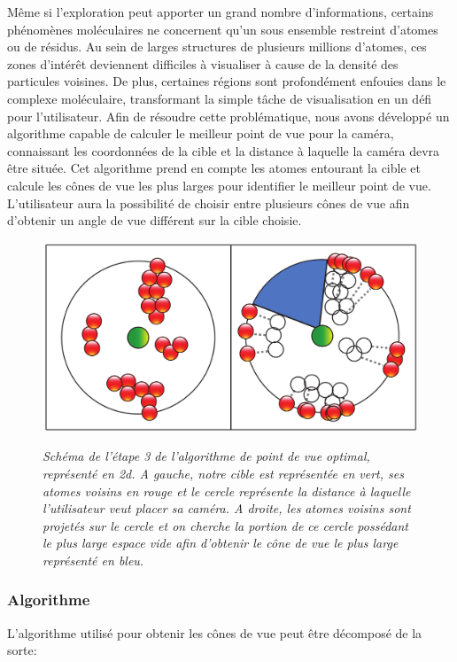 Même si l'exploration peut apporter un grand nombre d'informations, certains phénomènes moléculaires ne concernent qu'un sous ensemble restreint d'atomes ou de résidus. Au sein de larges structures de plusieurs millions d'atomes, ces zones d'intérêt deviennent difficiles à visualiser à cause de la densité des particules voisines. De plus, certaines régions sont profondément enfouies dans le complexe moléculaire, transformant la simple tâche de visualisation en un défi pour l'utilisateur. Afin de résoudre cette problématique, nous avons développé un algorithme capable de calculer le meilleur point de vue pour la caméra, connaissant les coordonnées de la cible et la distance à laquelle la caméra devra être située. Cet algorithme prend en compte les atomes entourant la cible et calcule les cônes de vue les plus larges pour identifier le meilleur point de vue. L'utilisateur aura la possibilité de choisir entre plusieurs cônes de vue afin d'obtenir un angle de vue différent sur la cible choisie.

\begin{figure}[h]
  \centering
  {\includegraphics[width=.5\linewidth]{./figures/ch3/voronoi_2D_algo_v2}}
    \caption[Schéma de l'étape 3 de l'algorithme de point de vue optimal, représenté en 2d.]{{\it Schéma de l'étape 3 de l'algorithme de point de vue optimal, représenté en 2d. A gauche, notre cible est représentée en vert, ses atomes voisins en rouge et le cercle représente la distance à laquelle l'utilisateur veut placer sa caméra. A droite, les atomes voisins sont projetés sur le cercle et on cherche la portion de ce cercle possédant le plus large espace vide afin d'obtenir le cône de vue le plus large représenté en bleu.}}
  \label{Fig:voronoi_2D_algo}
  \hspace{0.2cm}
\end{figure}

\subsubsection{Algorithme}

L'algorithme utilisé pour obtenir les cônes de vue peut être décomposé de la sorte:

